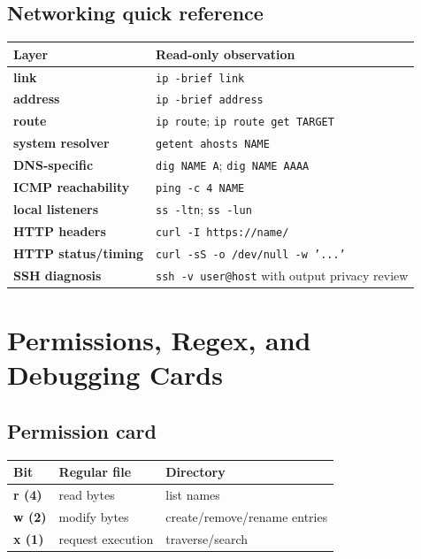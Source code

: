 \documentclass[11pt,oneside,openany]{book}
\begin{document}
\section{Networking quick reference}
\begin{center}
\begin{tabularx}{0.96\textwidth}{>{\bfseries}p{}X}
\toprule
Layer & Read-only observation \\
\midrule
link & \texttt{ip -brief link} \\
address & \texttt{ip -brief address} \\
route & \texttt{ip route}; \texttt{ip route get TARGET} \\
system resolver & \texttt{getent ahosts NAME} \\
DNS-specific & \texttt{dig NAME A}; \texttt{dig NAME AAAA} \\
ICMP reachability & \texttt{ping -c 4 NAME} \\
local listeners & \texttt{ss -ltn}; \texttt{ss -lun} \\
HTTP headers & \texttt{curl -I https://name/} \\
HTTP status/timing & \texttt{curl -sS -o /dev/null -w '...'} \\
SSH diagnosis & \texttt{ssh -v user@host} with output privacy review \\
\bottomrule
\end{tabularx}
\end{center}

\chapter{Permissions, Regex, and Debugging Cards}
\section{Permission card}
\begin{center}
\begin{tabularx}{0.96\textwidth}{>{\bfseries}p{}X X}
\toprule
Bit & Regular file & Directory \\
\midrule
r (4) & read bytes & list names \\
w (2) & modify bytes & create/remove/rename entries \\
x (1) & request execution & traverse/search \\
\bottomrule
\end{tabularx}
\end{center}
\end{document}
